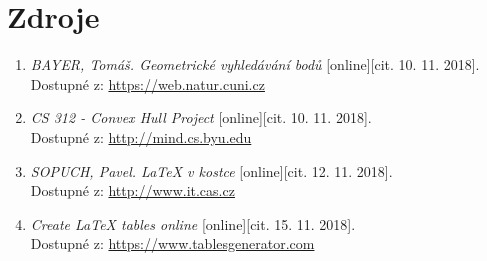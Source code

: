 \documentclass[a4paper, 12pt]{article}
\begin{document}
\section{Zdroje}
\begin{enumerate}
\item  \textsl{BAYER, Tomáš. Geometrické vyhledávání bodů} [online][cit. 10. 11. 2018].\\
Dostupné z: \href{https://web.natur.cuni.cz/~bayertom/images/courses/Adk/adk4.pdf}{https://web.natur.cuni.cz}

\item  \textsl{CS 312 - Convex Hull Project} [online][cit. 10. 11. 2018].\\
Dostupné z: \href{http://mind.cs.byu.edu/courses/312/projects/project2_files/ConvexHull_python.php}{http://mind.cs.byu.edu}

\item  \textsl{SOPUCH, Pavel. LaTeX v kostce} [online][cit. 12. 11. 2018].\\
Dostupné z: \href{http://www.it.cas.cz/manual/latex/}{http://www.it.cas.cz}

\item  \textsl{Create LaTeX tables online} [online][cit. 15. 11. 2018].\\
Dostupné z: \href{https://www.tablesgenerator.com/}{https://www.tablesgenerator.com}


\end{enumerate}
\end{document}
